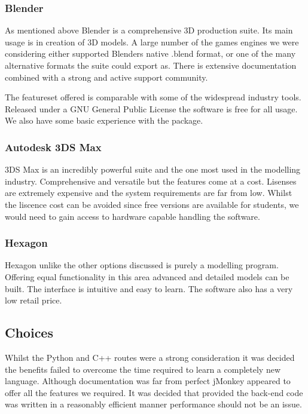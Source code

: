 \subsubsection*{Blender}

As mentioned above Blender is a comprehensive 3D production suite.
Its main usage is in creation of 3D models. A large number of the
games engines we were considering either supported Blenders native
.blend format, or one of the many alternative formats the suite could
export as. There is extensive documentation combined with a strong
and active support community.

The featureset offered is comparable with some of the widespread industry
tools. Released under a GNU General Public License the software is
free for all usage. We also have some basic experience with the package.


\subsubsection*{Autodesk 3DS Max}

3DS Max is an incredibly powerful suite and the one most used in the
modelling industry. Comprehensive and versatile but the features come
at a cost. Lisenses are extremely expensive and the system requirements
are far from low. Whilst the liscence cost can be avoided since free
versions are available for students, we would need to gain access
to hardware capable handling the software.


\subsubsection*{Hexagon}

Hexagon unlike the other options discussed is purely a modelling program.
Offering equal functionality in this area advanced and detailed models
can be built. The interface is intuitive and easy to learn. The software
also has a very low retail price.


\subsection*{Choices}

Whilst the Python and C++ routes were a strong consideration it was
decided the benefits failed to overcome the time required to learn
a completely new language. Although documentation was far from perfect
jMonkey appeared to offer all the features we required. It was decided
that provided the back-end code was written in a reasonably efficient
manner performance should not be an issue.

